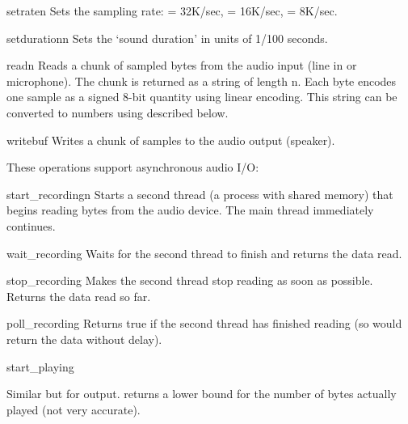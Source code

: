 \begin{funcdesc}{setrate}{n}
Sets the sampling rate:  = 32K/sec,  = 16K/sec,
 = 8K/sec.
\end{funcdesc}

\begin{funcdesc}{setduration}{n}
Sets the `sound duration' in units of 1/100 seconds.
\end{funcdesc}

\begin{funcdesc}{read}{n}
Reads a chunk of
sampled bytes from the audio input (line in or microphone).
The chunk is returned as a string of length n.
Each byte encodes one sample as a signed 8-bit quantity using linear
encoding.
This string can be converted to numbers using  described
below.
\end{funcdesc}

\begin{funcdesc}{write}{buf}
Writes a chunk of samples to the audio output (speaker).
\end{funcdesc}

These operations support asynchronous audio I/O:

\renewcommand{\indexsubitem}{(in module audio)}
\begin{funcdesc}{start_recording}{n}
Starts a second thread (a process with shared memory) that begins reading
bytes from the audio device.
The main thread immediately continues.
\end{funcdesc}

\begin{funcdesc}{wait_recording}{}
Waits for the second thread to finish and returns the data read.
\end{funcdesc}

\begin{funcdesc}{stop_recording}{}
Makes the second thread stop reading as soon as possible.
Returns the data read so far.
\end{funcdesc}

\begin{funcdesc}{poll_recording}{}
Returns true if the second thread has finished reading (so
 would return the data without delay).
\end{funcdesc}

\begin{funcdesc}{start_playing}{}
\begin{sloppypar}
Similar but for output.
returns a lower bound for the number of bytes actually played (not very
accurate).
\end{sloppypar}
\end{funcdesc}

